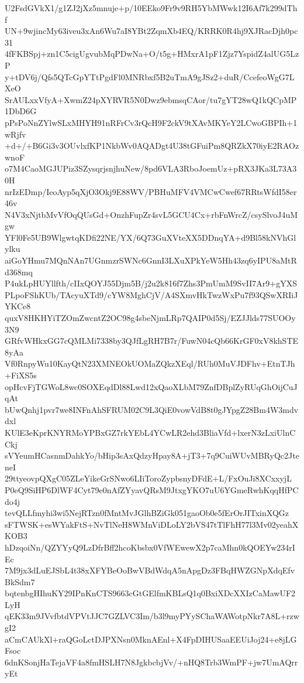 U2FsdGVkX1/g1ZJ2jXz5mnuje+p/10EEko9Fr9v9RH5YbMWwk12I6Af7k299dThf
UN+9wjincMy63iveu3xAn6Wu7aI8YBt2ZqmXb4EQ/KRRK0R4hj9XJRacDjh0pc31
4fFKBSpj+zn1C5cigUgvubMqPDwNa+O/t5g+HMxrA1pF1Zjz7YspidZ4alUG5LzP
y+tDV6j/Qfs5QTcGpYTtPgdFl0MNRbxf5B2uTmA9gJSz2+duR/CcefeoWgG7LXeO
SrAULxxVfyA+XwmZ24pXYRVR5N0Dwz9ebmsqCAor/tu7gYT28wQ1kQCpMP1DbD6G
pPsPoNnZYlwSLxMHYH91nRFrCv3rQcH9F2ckV9tXAvMKYeY2LCwoGBPIh+1wRjfv
+d+/+B6Gi3v3OUvlxfKP1NkbWv0AQADgt4U38tGFuiPm8QRZkX70iyE2RAOzwnoF
o7M4CaoMGJUPiz3SZysqrjsnjhuNew/8pd6VLA3RboJoemUz+pRX3JKa3L73A30H
nrIzEDmp/IeoAyp5qXjO3Okj9E88WV/PBHuMFV4VMCwCwef67RRtsWfdI58er46v
N4V3xNjtbMvVfOqQUsGd+OnzhFupZr4svL5GCU4Cx+rbFnWrcZ/csySlvoJ4uMgw
YFl0Fe5UB9WlgwtqKDfi22NE/YX/6Q73GuXVteXX5DDnqYA+d9Bl58kNVhGlylku
aiGoYHmu7MQnNAn7UGnmzrSWNc6GnnI3LXuXPkYeW5Hh43zq6yIPU8aMtRd368mq
P4ukLpHUYllfth/cIIxQOYJ55Djm5B/j2u2k816f7Zhs3PmUmM9SvII7Ar9+gYXS
PLpoFShKUb/TAcyuXTd9/cYW8MghCjV/A4SXmvHkTwzWxPu7f93QSwXRIiJYKCe8
quxV8HKHYiTZOmZwcntZ2OC98g4sbeNjmLRp7QAIP0d5Sj/EZJJlds77SUOOy3N9
GRfvWHkxGG7cQMLMi7338by3QJfLgRH7B7r/FuwN04cQb66KrGF0xV8khSTE8yAa
Vf0RnpyWu10KayQtN23XMNEOkUOMaZQkzXEql/RUh0MuVJDFhv+EtnTJh+FiXS5s
opHcvFjTGWoL8wc0SOXEqdDl88Lwd12xQaoXLbM79ZnfDBplZyRUqGhOijCuJqAt
bUwQnhj1pvr7we8INFnAhSFRUM02C9L3QiE0vowVdB8t0gJYpgZ28Bm4W3mdvdxl
KUlE3eKprKNYRMoYPBxGZ7rkYEbL4YCwLR2ehd3BliaVfd+lxerN3zLxiUlnCCkj
sVYeumHCasnmDahkYo/bHip3sAxQdzyHpay8A+jT3+7q9CuiWUvMBRyQc2JteneI
29ttyeovpQXgC05ZLeYikeGrSNwo6LIiToroZypbsnyDFdE+L/FxOuJi8XCxxyjL
P0eQ9SiHP6DlWF4Cyt79e0nAfZYyavQRsM9JtxgYKO7uU6YGmeRwhKqqHfPCdo4j
tevQLLfmyhi3wi5NejRTzn0fMntMvJGlhBZiGk051gaoOb0e5fErOrJITxinXQGz
sFTWSK+esWYakFtS+NvTlNeH8WMnViDLoLY2bVS47tTlFhH77l3Mv02yeahXKOB3
hDzqoiNn/QZYYyQ9LzDfrBff2hcoKbsbx0VfWEwewX2p7caMhn0kQOEYw234rIEc
7M9jx3dLuEJSbL4t38xXFYBeOoBwVBdWdqA5nApgDz3FBqHWZGNpXdqEfvBkSdm7
bqtenbgHIhuKY29IPnKnCTS9663cGtGElfmKBLsQ1q0BxiXDcXXIzCaMawUF2LyH
qEK33m9JVvfbtdVPVtJJC7GZLVC3Im/b3l9myPYySChaWAWotpNkr7A8L+rzwgI2
aCmCAUkXl+raQGoLctDJPXNsn0MknAEnl+X4FpDIHUSaaEEUiJoj24+e8jLGFsoc
6dnKSonjHaTejaVF4a8fmHSLH7N8JgkbcbjVv/+nHQ8Trb3WmPF+jw7UmAQrryEt
